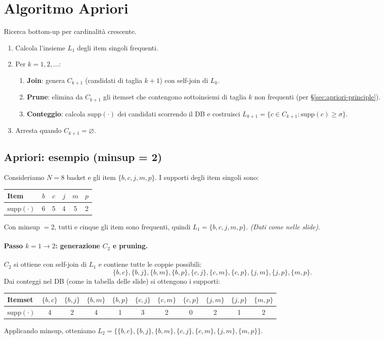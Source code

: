 \section{Algoritmo Apriori}\label{sec:apriori}
Ricerca bottom-up per cardinalità crescente.
\begin{enumerate}
  \item Calcola l'insieme $L_1$ degli item singoli frequenti.
  \item Per $k=1,2,\dots$:
  \begin{enumerate}
    \item \textbf{Join}: genera $C_{k+1}$ (candidati di taglia $k{+}1$) con self-join di $L_k$.
    \item \textbf{Prune}: elimina da $C_{k+1}$ gli itemset che contengono sottoinsiemi di taglia $k$ non frequenti (per \S\ref{sec:apriori-principle}).
    \item \textbf{Conteggio}: calcola $\mathrm{supp}(\cdot)$ dei candidati scorrendo il DB e costruisci $L_{k+1}=\{c\in C_{k+1}: \mathrm{supp}(c)\ge\sigma\}$.
  \end{enumerate}
  \item Arresta quando $C_{k+1}=\varnothing$.
\end{enumerate}

\subsection{Apriori: esempio (minsup = 2)}\label{subsec:apriori-esempio}
Consideriamo $N=8$ basket e gli item $\{b,c,j,m,p\}$. I supporti degli item singoli sono:
\begin{center}
\begin{tabular}{@{}lccccc@{}}
\toprule
Item & $b$ & $c$ & $j$ & $m$ & $p$ \\
\midrule
$\mathrm{supp}(\cdot)$ & 6 & 5 & 4 & 5 & 2 \\
\bottomrule
\end{tabular}
\end{center}
Con minsup $=2$, tutti e cinque gli item sono frequenti, quindi $L_1=\{b,c,j,m,p\}$. \emph{(Dati come nelle slide)}.

\paragraph{Passo $k=1\to2$: generazione $C_2$ e pruning.}
$C_2$ si ottiene con self-join di $L_1$ e contiene tutte le coppie possibili:
\[
\{b,c\},\{b,j\},\{b,m\},\{b,p\},\{c,j\},\{c,m\},\{c,p\},\{j,m\},\{j,p\},\{m,p\}.
\]
Dai conteggi nel DB (come in tabella delle slide) si ottengono i supporti:
\begin{center}
\begin{tabular}{@{}lcccccccccc@{}}
\toprule
Itemset & $\{b,c\}$ & $\{b,j\}$ & $\{b,m\}$ & $\{b,p\}$ & $\{c,j\}$ & $\{c,m\}$ & $\{c,p\}$ & $\{j,m\}$ & $\{j,p\}$ & $\{m,p\}$ \\
\midrule
$\mathrm{supp}(\cdot)$ & 4 & 2 & 4 & 1 & 3 & 2 & 0 & 2 & 1 & 2 \\
\bottomrule
\end{tabular}
\end{center}
Applicando minsup, otteniamo $L_2=\{\{b,c\},\{b,j\},\{b,m\},\{c,j\},\{c,m\},\{j,m\},\{m,p\}\}$. 

